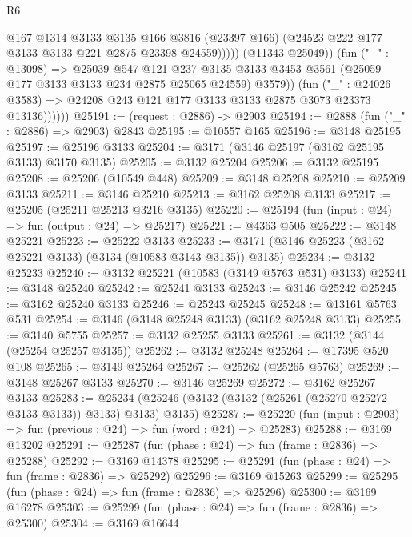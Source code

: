 \begin{lexlean}{R6}
\begin{coremodule}
                          @167
                          @1314
                          @3133
                          @3135
                          @166
                          @3816
                          (@23397 @166)
                          (@24523 @222 @177 @3133 @3133 @221 @2875 @23398 @24559)))))
                  (@11343 @25049))
                (fun ("_" : @13098) =>
                @25039
                  @547
                  @121
                  @237
                  @3135
                  @3133
                  @3453
                  @3561
                  (@25059 @177 @3133 @3133 @234 @2875 @25065 @24559)
                  @3579))
              (fun ("_" : @24026 @3583) =>
              @24208 @243 @121 @177 @3133 @3133 @2875 @3073 @23373 @13136))))))
@25191 := (request : @2886) -> @2903
@25194 := @2888 (fun ("_" : @2886) => @2903) @2843
@25195 := @10557 @165
@25196 := @3148 @25195
@25197 := @25196 @3133
@25204 := @3171 (@3146 @25197 (@3162 @25195 @3133) @3170 @3135)
@25205 := @3132 @25204
@25206 := @3132 @25195
@25208 := @25206 (@10549 @448)
@25209 := @3148 @25208
@25210 := @25209 @3133
@25211 := @3146 @25210
@25213 := @3162 @25208 @3133
@25217 := @25205 (@25211 @25213 @3216 @3135)
@25220 := @25194 (fun (input : @24) => fun (output : @24) => @25217)
@25221 := @4363 @505
@25222 := @3148 @25221
@25223 := @25222 @3133
@25233 := @3171 (@3146 @25223 (@3162 @25221 @3133) (@3134 (@10583 @3143 @3135)) @3135)
@25234 := @3132 @25233
@25240 := @3132 @25221 (@10583 (@3149 @5763 @531) @3133)
@25241 := @3148 @25240
@25242 := @25241 @3133
@25243 := @3146 @25242
@25245 := @3162 @25240 @3133
@25246 := @25243 @25245
@25248 := @13161 @5763 @531
@25254 := @3146 (@3148 @25248 @3133) (@3162 @25248 @3133)
@25255 := @3140 @5755
@25257 := @3132 @25255 @3133
@25261 := @3132 (@3144 (@25254 @25257 @3135))
@25262 := @3132 @25248
@25264 := @17395 @520 @108
@25265 := @3149 @25264
@25267 := @25262 (@25265 @5763)
@25269 := @3148 @25267 @3133
@25270 := @3146 @25269
@25272 := @3162 @25267 @3133
@25283 := @25234 (@25246 (@3132 (@3132 (@25261 (@25270 @25272 @3133 @3133)) @3133) @3133) @3135)
@25287 := @25220 (fun (input : @2903) => fun (previous : @24) => fun (word : @24) => @25283)
@25288 := @3169 @13202
@25291 := @25287 (fun (phase : @24) => fun (frame : @2836) => @25288)
@25292 := @3169 @14378
@25295 := @25291 (fun (phase : @24) => fun (frame : @2836) => @25292)
@25296 := @3169 @15263
@25299 := @25295 (fun (phase : @24) => fun (frame : @2836) => @25296)
@25300 := @3169 @16278
@25303 := @25299 (fun (phase : @24) => fun (frame : @2836) => @25300)
@25304 := @3169 @16644

\end{coremodule}
\end{lexlean}
